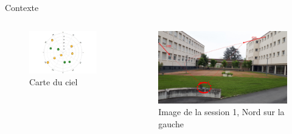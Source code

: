 \documentclass[xcolor=dvipsnames,envcountsect]{beamer}
\begin{document}
\begin{frame}{Contexte}
	\begin{columns}
		\begin{column}{0.5\textwidth}
			\begin{figure}
				\centering
				\includegraphics[width=1\textwidth]{./Figures/skyplot.jpg}
				\caption {Carte du ciel}
			\end{figure}
		\end{column}
		\begin{column}{0.5\textwidth}
			\begin{figure}
				\centering
				\includegraphics[width=1\textwidth]{./Figures/spot1.jpg}
				\caption {Image de la session 1, Nord sur la gauche}
			\end{figure}
		\end{column}

	\end{columns}
\end{frame}
\end{document}
